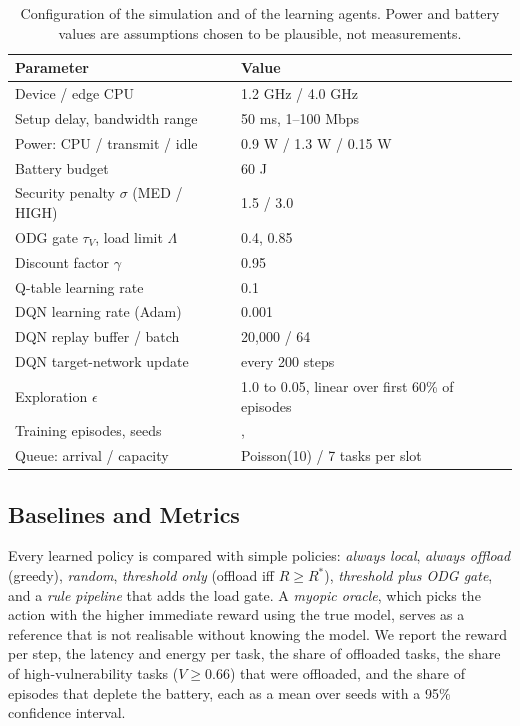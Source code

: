 \documentclass{ieeeaccess}
\begin{document}
\begin{table}[t]
\caption{Configuration of the simulation and of the learning agents. Power and battery values are assumptions chosen to be plausible, not measurements.}
\label{tab:params}
\centering
\footnotesize
\begin{tabular}{@{}p{4.1cm}p{4.2cm}@{}}
\toprule
Parameter & Value \\
\midrule
Device / edge CPU & 1.2 GHz / 4.0 GHz \\
Setup delay, bandwidth range & 50 ms, 1--100 Mbps \\
Power: CPU / transmit / idle & 0.9 W / 1.3 W / 0.15 W \\
Battery budget & 60 J \\
Security penalty $\sigma$ (MED / HIGH) & 1.5 / 3.0 \\
ODG gate $\tau_V$, load limit $\Lambda$ & 0.4, 0.85 \\
Discount factor $\gamma$ & 0.95 \\
Q-table learning rate & 0.1 \\
DQN learning rate (Adam) & 0.001 \\
DQN replay buffer / batch & 20{,}000 / 64 \\
DQN target-network update & every 200 steps \\
Exploration $\epsilon$ & 1.0 to 0.05, linear over first 60\% of episodes \\
Training episodes, seeds & \NEpisodes{}, \NSeeds{} \\
Queue: arrival / capacity & Poisson(10) / 7 tasks per slot \\
\bottomrule
\end{tabular}
\end{table}

\subsection{Baselines and Metrics}
Every learned policy is compared with simple policies: \emph{always local}, \emph{always offload} (greedy), \emph{random}, \emph{threshold only} (offload iff $R\ge R^{*}$), \emph{threshold plus ODG gate}, and a \emph{rule pipeline} that adds the load gate. A \emph{myopic oracle}, which picks the action with the higher immediate reward using the true model, serves as a reference that is not realisable without knowing the model. We report the reward per step, the latency and energy per task, the share of offloaded tasks, the share of high-vulnerability tasks ($V\ge0.66$) that were offloaded, and the share of episodes that deplete the battery, each as a mean over seeds with a 95\% confidence interval.
\end{document}
